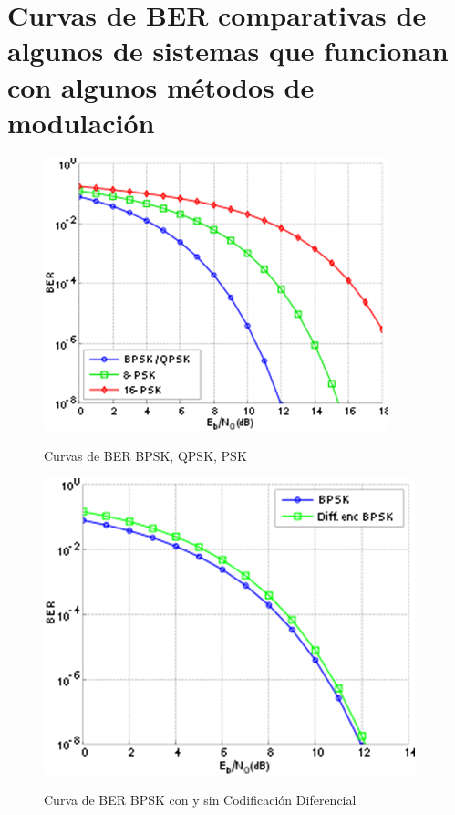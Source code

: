 \section{Curvas de BER comparativas de algunos de sistemas que funcionan con algunos métodos de modulación} 

\begin{figure}[h!]
	\captionsetup{justification = raggedright, singlelinecheck = false}
	\caption{Curvas de BER BPSK, QPSK, PSK} 
	\centering
	\includegraphics[scale=1]{Imagenes/Eb.png}
	\label{fig:Eb}
\end{figure}	


\vspace{200px}
\begin{figure}[h!]
	\captionsetup{justification = raggedright, singlelinecheck = false}
	\caption{Curva de BER BPSK con y sin Codificación Diferencial} 
	\centering
	\includegraphics[scale=1]{Imagenes/Ber.png}
	\label{fig:Ber}
\end{figure}	

